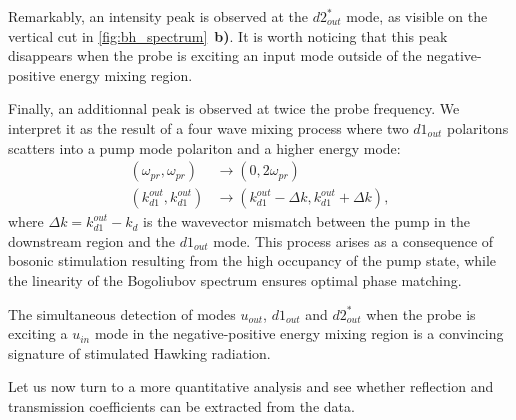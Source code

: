 Remarkably, an intensity peak is observed at the $d2_{out}^*$ mode, as visible on the vertical cut in \autoref{fig:bh_spectrum}~\textbf{b)}. It is worth noticing that this peak disappears when the probe 
is exciting an input mode outside of the negative-positive energy mixing region.

Finally, an additionnal peak is observed at twice the probe frequency. We interpret it as the result of a four wave mixing process where two $d1_{out}$ polaritons scatters into a pump mode polariton and a higher energy mode:
\begin{equation}
    \begin{aligned}
    (\omega_{pr}, \omega_{pr}) &\to (0, 2\omega_{pr}) \\
    (k_{d1}^{out}, k_{d1}^{out}) &\to (k_{d1}^{out}-\Delta k,k_{d1}^{out}+\Delta k),
    \end{aligned}
    \label{eq:higher_order_four_wave_mixing}
\end{equation}
where $\Delta k= k_{d1}^{out}-k_d$ is the wavevector mismatch between the pump in the downstream region and the $d1_{out}$ mode. This process arises as a consequence of bosonic stimulation resulting from the high occupancy of the pump state, while the linearity of the Bogoliubov spectrum ensures optimal phase matching.

\bigskip

The simultaneous detection of modes $u_{out}$, $d1_{out}$ and $d2_{out}^*$ when the probe is exciting a $u_{in}$ mode in the negative-positive energy mixing region is a convincing signature of stimulated Hawking radiation.

Let us now turn to a more quantitative analysis and see whether reflection and transmission coefficients can be extracted from the data.

